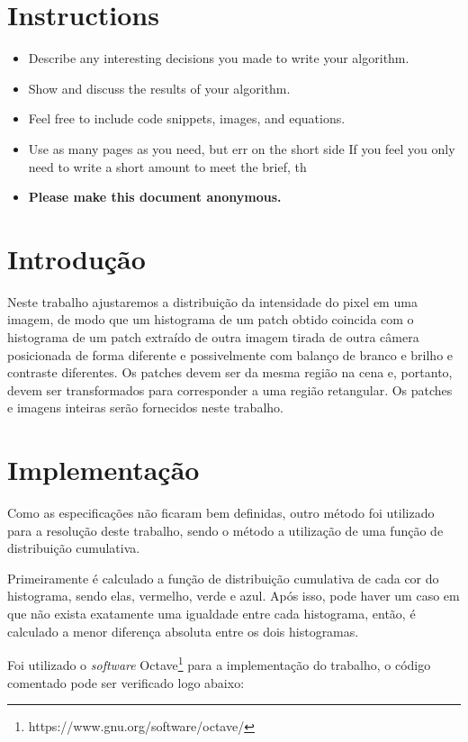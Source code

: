 \section*{Instructions}
\begin{itemize}
  \item Describe any interesting decisions you made to write your algorithm.
  \item Show and discuss the results of your algorithm.
  \item Feel free to include code snippets, images, and equations.
  \item Use as many pages as you need, but err on the short side If you feel you only need to write a short amount to meet the brief, th
  
  \item \textbf{Please make this document anonymous.}
\end{itemize}

\section*{Introdução}

Neste trabalho ajustaremos a distribuição da intensidade do pixel em uma imagem, de modo que um histograma de um patch obtido coincida com o histograma de um patch extraído de outra imagem tirada de outra câmera posicionada de forma diferente e possivelmente com balanço de branco e brilho e contraste diferentes. Os patches devem ser da mesma região na cena e, portanto, devem ser transformados para corresponder a uma região retangular. Os patches e imagens inteiras serão fornecidos neste trabalho.


\section*{Implementação}

Como as especificações não ficaram bem definidas, outro método foi utilizado para a resolução deste trabalho, sendo o método a utilização de uma função de distribuição cumulativa.

Primeiramente é calculado a função de distribuição cumulativa de cada cor do histograma, sendo elas, vermelho, verde e azul. Após isso, pode haver um caso em que não exista exatamente uma igualdade entre cada histograma, então, é calculado a menor diferença absoluta entre os dois histogramas.



Foi utilizado o \textit{software} Octave\footnote{https://www.gnu.org/software/octave/} para a implementação do trabalho, o código comentado pode ser verificado logo abaixo: 

